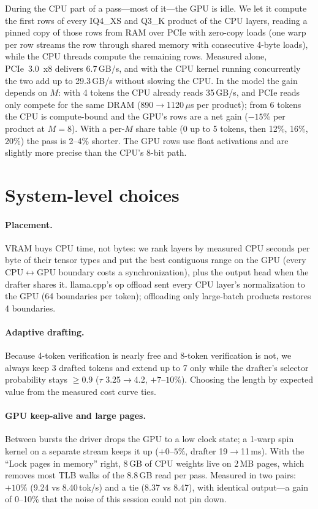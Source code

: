 \documentclass[10pt]{article}
\newcommand{\tps}{tok/s}
\begin{document}
During the CPU part of a pass---most of it---the GPU is idle. We let it compute the first rows of every IQ4\_XS and
Q3\_K product of the CPU layers, reading a pinned copy of those rows from RAM over PCIe with zero-copy loads (one
warp per row streams the row through shared memory with consecutive 4-byte loads), while the CPU threads compute the
remaining rows. Measured alone, PCIe~3.0~x8 delivers 6.7\,GB/s, and with the CPU kernel running concurrently the two
add up to 29.3\,GB/s without slowing the CPU. In the model the gain depends on $M$: with 4 tokens the CPU already reads
35\,GB/s, and PCIe reads only compete for the same DRAM (890$\to$1120\,$\mu$s per product); from 6 tokens the CPU is
compute-bound and the GPU's rows are a net gain ($-15\%$ per product at $M=8$). With a per-$M$ share table
($0$ up to 5 tokens, then 12\%, 16\%, 20\%) the pass is 2--4\% shorter. The GPU rows use float activations and are
slightly more precise than the CPU's 8-bit path.

\section{System-level choices}\label{sec:system}

\paragraph{Placement.} VRAM buys CPU time, not bytes: we rank layers by measured CPU seconds per byte of their tensor
types and put the best contiguous range on the GPU (every CPU$\leftrightarrow$GPU boundary costs a synchronization),
plus the output head when the drafter shares it. llama.cpp's op offload sent every CPU layer's normalization to the GPU
(64 boundaries per token); offloading only large-batch products restores 4 boundaries.

\paragraph{Adaptive drafting.} Because 4-token verification is nearly free and 8-token verification is not, we always
keep 3 drafted tokens and extend up to 7 only while the drafter's selector probability stays $\ge0.9$
($\tau$ 3.25$\to$4.2, $+7$--$10\%$). Choosing the length by expected value from the measured cost curve ties.

\paragraph{GPU keep-alive and large pages.} Between bursts the driver drops the GPU to a low clock state; a 1-warp spin
kernel on a separate stream keeps it up ($+0$--$5\%$, drafter 19$\to$11\,ms). With the ``Lock pages in memory'' right,
8\,GB of CPU weights live on 2\,MB pages, which removes most TLB walks of the 8.8\,GB read per pass. Measured in two
pairs: $+10\%$ (9.24 vs 8.40\,\tps) and a tie (8.37 vs 8.47), with identical output---a gain of 0--10\% that the
noise of this session could not pin down.
\end{document}
